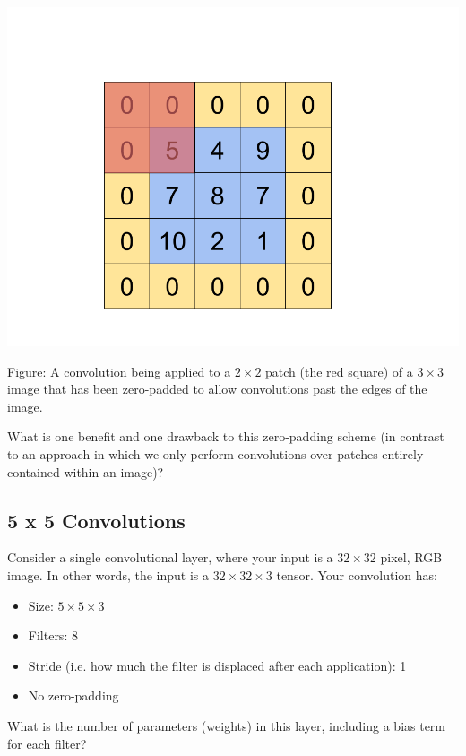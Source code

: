 \begin{center}
  \includegraphics[width=.49\textwidth]{Plots/ConvolutionExample.png}
\end{center}
\begin{small}
Figure: A convolution being applied to a $2 \times 2$ patch (the red square) of a $3 \times 3$ image that has been zero-padded to allow convolutions past the edges of the image.
\end{small}

What is one benefit and one drawback to this zero-padding scheme (in contrast to an approach in which we only perform convolutions over patches entirely contained within an image)?

\begin{solution}

\end{solution}

\subsection{5 x 5 Convolutions}

Consider a single convolutional layer, where your input is a $32 \times 32$ pixel, RGB image. In other words, the input is a $32 \times 32 \times 3$ tensor. Your convolution has:

\begin{itemize}
\item Size: $5 \times 5 \times 3$
\item Filters: 8
\item Stride (i.e. how much the filter is displaced after each application): 1
\item No zero-padding
\end{itemize}

\problem[2] What is the number of parameters (weights) in this layer, including a bias term for each filter?

\begin{subsolution}

\end{subsolution}

